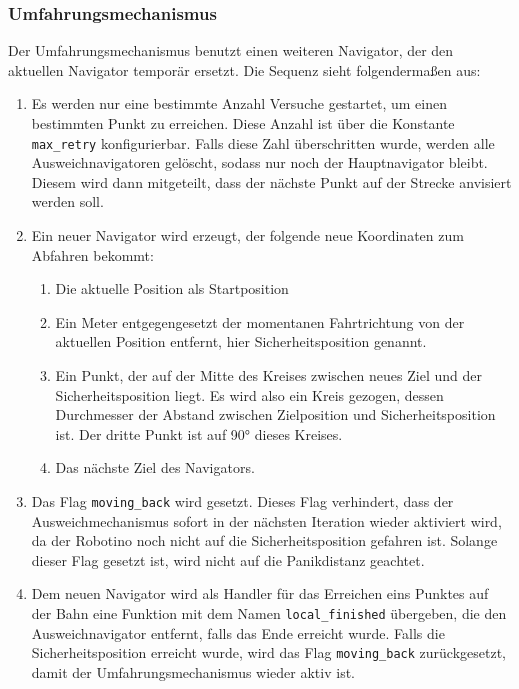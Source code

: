 \subsubsection{Umfahrungsmechanismus}

Der Umfahrungsmechanismus benutzt einen weiteren Navigator, der den aktuellen
Navigator temporär ersetzt. Die Sequenz sieht folgendermaßen aus:

\begin{enumerate}
	\item Es werden nur eine bestimmte Anzahl Versuche gestartet, um einen
		bestimmten Punkt zu erreichen. Diese Anzahl ist über die Konstante
		\verb|max_retry| konfigurierbar. Falls diese Zahl überschritten wurde,
		werden alle Ausweichnavigatoren gelöscht, sodass nur noch der
		Hauptnavigator bleibt. Diesem wird dann mitgeteilt, dass der nächste
		Punkt auf der Strecke anvisiert werden soll.

	\item Ein neuer Navigator wird erzeugt, der folgende neue Koordinaten zum
		Abfahren bekommt:
		\begin{enumerate}
			\item Die aktuelle Position als Startposition
			\item Ein Meter entgegengesetzt der momentanen Fahrtrichtung von der
				aktuellen Position entfernt, hier Sicherheitsposition genannt.
			\item Ein Punkt, der auf der Mitte des Kreises zwischen neues Ziel und
				der Sicherheitsposition liegt. Es wird also ein Kreis gezogen,
				dessen Durchmesser der Abstand zwischen Zielposition und
				Sicherheitsposition ist. Der dritte Punkt ist auf 90° dieses
				Kreises.
			\item Das nächste Ziel des Navigators.
		\end{enumerate}

	\item Das Flag \verb|moving_back| wird gesetzt. Dieses Flag verhindert, dass
		der Ausweichmechanismus sofort in der nächsten Iteration wieder aktiviert
		wird, da der Robotino noch nicht auf die Sicherheitsposition gefahren
		ist. Solange dieser Flag gesetzt ist, wird nicht auf die Panikdistanz
		geachtet.

	\item Dem neuen Navigator wird als Handler für das Erreichen eins Punktes
		auf der Bahn eine Funktion mit dem Namen \verb|local_finished| übergeben,
		die den Ausweichnavigator entfernt, falls das Ende erreicht wurde. Falls
		die Sicherheitsposition erreicht wurde, wird das Flag \verb|moving_back|
		zurückgesetzt, damit der Umfahrungsmechanismus wieder aktiv ist.
\end{enumerate}

